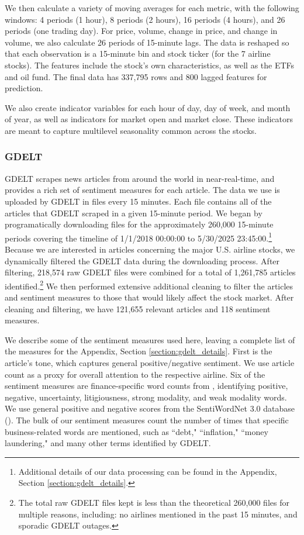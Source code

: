 \documentclass[12pt]{article}
\begin{document}
We then calculate a variety of moving averages for each metric, with the following windows: 4 periods (1 hour), 8 periods (2 hours), 16 periods (4 hours), and 26 periods (one trading day). For price, volume, change in price, and change in volume, we also calculate 26 periods of 15-minute lags. The data is reshaped so that each observation is a 15-minute bin and stock ticker (for the 7 airline stocks). The features include the stock's own characteristics, as well as the ETFs and oil fund. The final data has 337,795 rows and 800 lagged features for prediction.

We also create indicator variables for each hour of day, day of week, and month of year, as well as indicators for market open and market close. These indicators are meant to capture multilevel seasonality common across the stocks.

\subsubsection{GDELT}
GDELT scrapes news articles from around the world in near-real-time, and provides a rich set of sentiment measures for each article. The data we use is uploaded by GDELT in files every 15 minutes. Each file contains all of the articles that GDELT scraped in a given 15-minute period. We began by programatically downloading files for the approximately 260,000 15-minute periods covering the timeline of 1/1/2018 00:00:00 to 5/30/2025 23:45:00.\footnote{Additional details of our data processing can be found in the Appendix, Section \ref{section:gdelt_details}.} Because we are interested in articles concerning the major U.S. airline stocks, we dynamically filtered the GDELT data during the downloading process. After filtering, 218,574 raw GDELT files were combined for a total of 1,261,785 articles identified.\footnote{The total raw GDELT files kept is less than the theoretical 260,000 files for multiple reasons, including: no airlines mentioned in the past 15 minutes, and sporadic GDELT outages.} We then performed extensive additional cleaning to filter the articles and sentiment measures to those that would likely affect the stock market. After cleaning and filtering, we have 121,655 relevant articles and 118 sentiment measures.

We describe some of the sentiment measures used here, leaving a complete list of the measures for the Appendix, Section \ref{section:gdelt_details}. First is the article's tone, which captures general positive/negative sentiment. We use article count as a proxy for overall attention to the respective airline. Six of the sentiment measures are finance-specific word counts from \textcite{loughran2011liability}, identifying positive, negative, uncertainty, litigiousness, strong modality, and weak modality words. We use general positive and negative scores from the SentiWordNet 3.0 database (\textcite{baccianella2010sentiwordnet}). The bulk of our sentiment measures count the number of times that specific business-related words are mentioned, such as ``debt," ``inflation," ``money laundering," and many other terms identified by GDELT.
\end{document}
